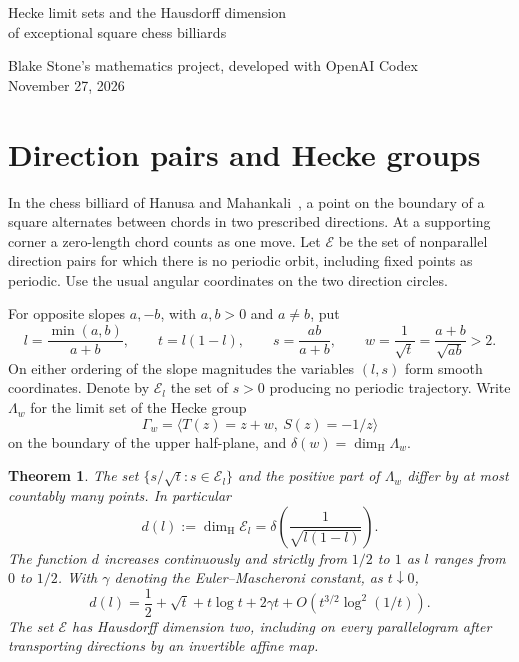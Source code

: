 \documentclass[11pt]{article}
\newtheorem{theorem}{Theorem}
\newcommand{\dimH}{\dim_{\mathrm H}}
\begin{document}
\begin{center}
{\LARGE Hecke limit sets and the Hausdorff dimension\\[3pt]of exceptional square chess billiards}\par\medskip
Blake Stone's mathematics project, developed with OpenAI Codex\\November 27, 2026
\end{center}
\begin{abstract}
The pairs of directions for which square chess billiards has no periodic trajectory form a set of angular measure zero and Hausdorff dimension two. Along each ray of unequal opposite slope magnitudes, their dimension equals that of a Hecke triangle group limit set, with group parameter $(a+b)/\sqrt{ab}$ for slopes $a,-b$. This yields the complete range of slice dimensions and an asymptotic expansion at extreme slope ratios. The proof identifies the chess-billiard exceptional sets, up to countably many points, with the classical limit sets.
\end{abstract}

\section{Direction pairs and Hecke groups}

In the chess billiard of Hanusa and Mahankali~\cite{HM}, a point on the boundary of a square alternates between chords in two prescribed directions. At a supporting corner a zero-length chord counts as one move. Let $\mathcal E$ be the set of nonparallel direction pairs for which there is no periodic orbit, including fixed points as periodic. Use the usual angular coordinates on the two direction circles.

For opposite slopes $a,-b$, with $a,b>0$ and $a\ne b$, put
\[
 l=\frac{\min(a,b)}{a+b},\qquad t=l(1-l),\qquad s=\frac{ab}{a+b},
 \qquad w=\frac{1}{\sqrt t}=\frac{a+b}{\sqrt{ab}}>2.
\]
On either ordering of the slope magnitudes the variables $(l,s)$ form smooth coordinates. Denote by $\mathcal E_l$ the set of $s>0$ producing no periodic trajectory. Write $\Lambda_w$ for the limit set of the Hecke group
\[
 \Gamma_w=\langle T(z)=z+w,\ S(z)=-1/z\rangle
\]
on the boundary of the upper half-plane, and $\delta(w)=\dimH\Lambda_w$.

\begin{theorem}\label{main}
The set $\{s/\sqrt t:s\in\mathcal E_l\}$ and the positive part of $\Lambda_w$ differ by at most countably many points. In particular
\[
 d(l):=\dimH\mathcal E_l=\delta\!\left(\frac{1}{\sqrt{l(1-l)}}\right).
\]
The function $d$ increases continuously and strictly from $1/2$ to $1$ as $l$ ranges from $0$ to $1/2$. With $\gamma$ denoting the Euler--Mascheroni constant, as $t\downarrow0$,
\[
 d(l)=\frac12+\sqrt t+t\log t+2\gamma t
       +O\!\left(t^{3/2}\log^2(1/t)\right).
\]
The set $\mathcal E$ has Hausdorff dimension two, including on every parallelogram after transporting directions by an invertible affine map.
\end{theorem}
\end{document}
